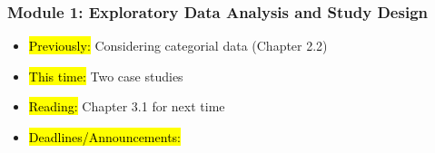 
\begin{frame}
    \frametitle{Module 1: Exploratory Data Analysis and Study Design}
    \begin{itemize}
        \item \hl{Previously: } Considering categorial data (Chapter 2.2)
        \item \hl{This time: } Two case studies
        \item \hl{Reading: } Chapter 3.1 for next time
        \item \hl{Deadlines/Announcements: } 
    \end{itemize}
    
\end{frame}
    